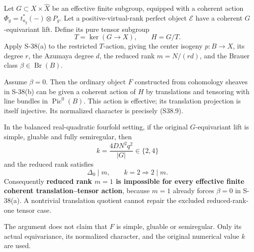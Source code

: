 \begin{corollary}
\label{cor:semireg-mixed-reduced-rank}
Let \(G\subset X\times\widehat X\) be an effective finite subgroup, equipped with a coherent action \(\Phi_g=t_{a_g}^*(-)\otimes P_g\). Let a positive-virtual-rank perfect object \(\mathcal E\) have a coherent \(G\)-equivariant lift. Define its pure tensor subgroup \[
 T=\ker(G\longrightarrow X),\qquad H=G/T.
 \tag{S38.16}
\] Apply S-38(a) to the restricted \(T\)-action, giving the center isogeny \(p:B\to X\), its degree \(r\), the Azumaya degree \(d\), the reduced rank \(m=N/(rd)\), and the Brauer class \(\beta\in\operatorname{Br}(B)\).

Assume \(\beta=0\). Then the ordinary object \(F\) constructed from cohomology sheaves in S-38(b) can be given a coherent action of \(H\) by translations and tensoring with line bundles in \(\operatorname{Pic}^0(B)\). This action is effective; its translation projection is itself injective. Its normalized character is precisely (S38.9).

In the balanced real-quadratic fourfold setting, if the original \(G\)-equivariant lift is simple, gluable and fully semiregular, then \[
 k=\frac{4DN^2q^2}{|G|}\in\{2,4\}
\] and the reduced rank satisfies \[
 \boxed{\Delta_0\mid m,\qquad k=2\Longrightarrow2\mid m.}
 \tag{S38.17}
\] Consequently \textbf{reduced rank \(m=1\) is impossible for every effective finite coherent translation--tensor action}, because \(m=1\) already forces \(\beta=0\) in S-38(a). A nontrivial translation quotient cannot repair the excluded reduced-rank-one tensor case.

The argument does not claim that \(F\) is simple, gluable or semiregular. Only its actual equivariance, its normalized character, and the original numerical value \(k\) are used.
\end{corollary}
